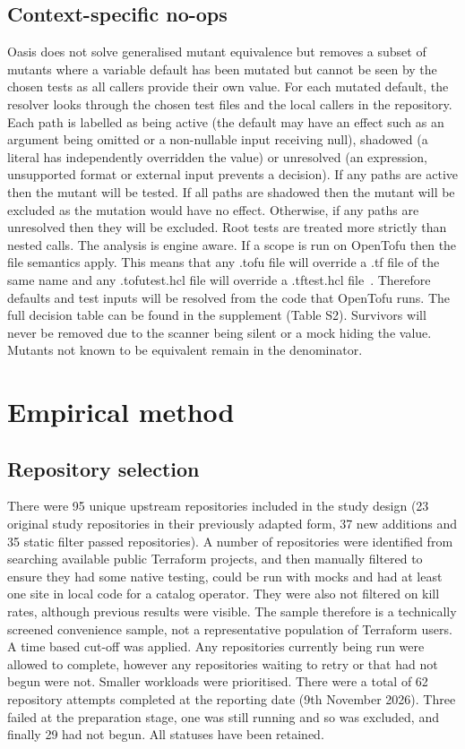 \documentclass[3p,times,procedia]{elsarticle}
\begin{document}
\subsection{Context-specific no-ops}\label{sec:equivalence}
Oasis does not solve generalised mutant equivalence but removes a subset of mutants where a variable default has been mutated but cannot be seen by the chosen tests as all callers provide their own value. For each mutated default, the resolver looks through the chosen test files and the local callers in the repository. Each path is labelled as being active (the default may have an effect such as an argument being omitted or a non-nullable input receiving null), shadowed (a literal has independently overridden the value) or unresolved (an expression, unsupported format or external input prevents a decision). If any paths are active then the mutant will be tested. If all paths are shadowed then the mutant will be excluded as the mutation would have no effect. Otherwise, if any paths are unresolved then they will be excluded. Root tests are treated more strictly than nested calls. The analysis is engine aware. If a scope is run on OpenTofu then the file semantics apply. This means that any .tofu file will override a .tf file of the same name and any .tofutest.hcl file will override a .tftest.hcl file~\cite{tofufiles}. Therefore defaults and test inputs will be resolved from the code that OpenTofu runs. The full decision table can be found in the supplement (Table S2). Survivors will never be removed due to the scanner being silent or a mock hiding the value. Mutants not known to be equivalent remain in the denominator.

\section{Empirical method}\label{sec:method}
\subsection{Repository selection}\label{sec:selection}
There were 95 unique upstream repositories included in the study design (23 original study repositories in their previously adapted form, 37 new additions and 35 static filter passed repositories). A number of repositories were identified from searching available public Terraform projects, and then manually filtered to ensure they had some native testing, could be run with mocks and had at least one site in local code for a catalog operator. They were also not filtered on kill rates, although previous results were visible. The sample therefore is a technically screened convenience sample, not a representative population of Terraform users.
A time based cut-off was applied. Any repositories currently being run were allowed to complete, however any repositories waiting to retry or that had not begun were not. Smaller workloads were prioritised. There were a total of 62 repository attempts completed at the reporting date (9th November 2026). Three failed at the preparation stage, one was still running and so was excluded, and finally 29 had not begun. All statuses have been retained.
\end{document}
